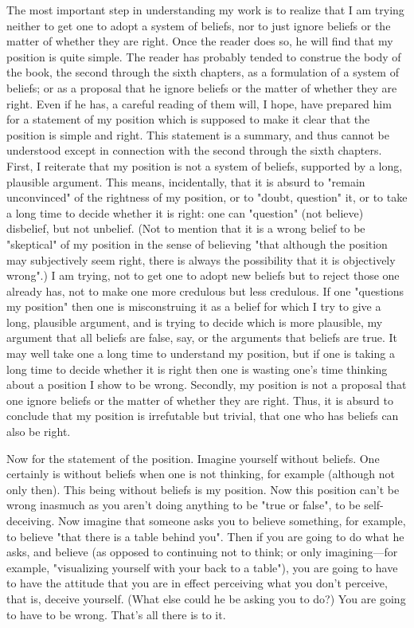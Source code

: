 \documentclass[10pt,twoside]{memoir}
\begin{document}
\begin{enumerate}
{The most important step in understanding my work is to realize that I 
am trying neither to get one to adopt a system of beliefs, nor to just ignore 
beliefs or the matter of whether they are right. Once the reader does so, he 
will find that my position is quite simple. The reader has probably tended to 
construe the body of the book, the second through the sixth chapters, as a 
formulation of a system of beliefs; or as a proposal that he ignore beliefs or 
the matter of whether they are right. Even if he has, a careful reading of 
them will, I hope, have prepared him for a statement of my position which is 
supposed to make it clear that the position is simple and right. This 
statement is a summary, and thus cannot be understood except in 
connection with the second through the sixth chapters. First, I reiterate that 
my position is not a system of beliefs, supported by a long, plausible 
argument. This means, incidentally, that it is absurd to "remain 
unconvinced" of the rightness of my position, or to "doubt, question" it, or 
to take a long time to decide whether it is right: one can "question" (not 
believe) disbelief, but not unbelief. (Not to mention that it is a wrong belief 
to be "skeptical" of my position in the sense of believing "that although the 
position may subjectively seem right, there is always the possibility that it is 
objectively wrong".) I am trying, not to get one to adopt new beliefs but to 
reject those one already has, not to make one more credulous but less 
credulous. If one "questions my position" then one is misconstruing it as a 
belief for which I try to give a long, plausible argument, and is trying to 
decide which is more plausible, my argument that all beliefs are false, say, or 
the arguments that beliefs are true. It may well take one a long time to 
understand my position, but if one is taking a long time to decide whether it 
is right then one is wasting one's time thinking about a position I show to be 
wrong. Secondly, my position is not a proposal that one ignore beliefs or the 
matter of whether they are right. Thus, it is absurd to conclude that my 
position is irrefutable but trivial, that one who has beliefs can also be right. 

Now for the statement of the position. Imagine yourself without 
beliefs. One certainly is without beliefs when one is not thinking, for 
example (although not only then). This being without beliefs is my position. 
Now this position can't be wrong inasmuch as you aren't doing anything to 
be "true or false", to be self-deceiving. Now imagine that someone asks you 
to believe something, for example, to believe "that there is a table behind 
you". Then if you are going to do what he asks, and believe (as opposed to 
continuing not to think; or only imagining---for example, "visualizing 
yourself with your back to a table"), you are going to have to have the 
attitude that you are in effect perceiving what you don't perceive, that is, 
deceive yourself. (What else could he be asking you to do?) You are going 
to have to be wrong. That's all there is to it. 

}
\end{enumerate}
\end{document}

